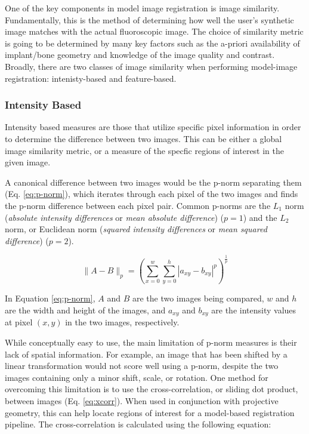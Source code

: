One of the key components in model image registration is image similarity. Fundamentally, this is the method of determining how well the user's synthetic image matches with the actual fluoroscopic image. The choice of similarity metric is going to be determined by many key factors such as the a-priori availability of implant/bone geometry and knowledge of the image quality and contrast. Broadly, there are two classes of image similarity when performing model-image registration: intenisty-based and feature-based.

\subsubsection{Intensity Based}
\label{sec:img-sim-intensity}
Intensity based measures are those that utilize specific pixel information in order to determine the difference between two images. This can be either a global image similarity metric, or a measure of the specfic regions of interest in the given image.

A canonical difference between two images would be the p-norm separating them (Eq. \ref{eq:p-norm}), which iterates through each pixel of the two images and finds the p-norm difference between each pixel pair. Common p-norms are the $L_1$ norm (\emph{absolute intensity differences} or \emph{mean absolute difference}) \cite{kanadeStereoMatchingAlgorithm1994} ($p=1$) and the $L_{2}$ norm, or Euclidean norm (\emph{squared intensity differences} or \emph{mean squared difference}) \cite{hannahComputerMatchingAreas1977}($p=2$).

\begin{equation}
    \|A-B\|_{p} = (\sum_{x=0}^{w}\sum_{y=0}^{h}|a_{xy}-b_{xy}|^{p})^{\frac{1}{p}}
    \label{eq:p-norm}
\end{equation}

In Equation \cref{eq:p-norm}, $A$ and $B$ are the two images being compared, $w$ and $h$ are the width and height of the images, and $a_{xy}$ and $b_{xy}$ are the intensity values at pixel $(x,y)$ in the two images, respectively.

While conceptually easy to use, the main limitation of p-norm measures is their lack of spatial information. For example, an image that has been shifted by a linear transformation would not score well using a p-norm, despite the two images containing only a minor shift, scale, or rotation. One method for overcoming this limitation is to use the cross-correlation, or sliding dot product, between images \cite{bendatRandomDataAnalysis2010,hannahComputerMatchingAreas1977} (Eq. \ref{eq:xcorr}). When used in conjunction with projective geometry, this can help locate regions of interest for a model-based registration pipeline. The cross-correlation is calculated using the following equation:

